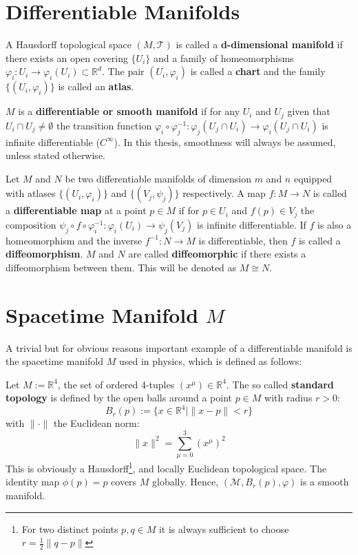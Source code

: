 \section{Differentiable Manifolds}

A Hausdorff topological space $(M,\mathcal{T})$ is called a \textbf{d-dimensional manifold} if there exists an open covering \( \{U_i\} \) and a family of homeomorphisms \( \varphi_i: U_i \to \varphi_i(U_i) \subset \mathbb{R}^d \). The pair \( (U_i, \varphi_i) \) is called a \textbf{chart} and the family $\{(U_i,\varphi_i)\}$ is called an \textbf{atlas}\cite{FredericSchullerTopologicalmanifoldsmanifoldbundlesLec06FredericSchuller2015}.

$M$ is a \textbf{differentiable or smooth manifold} if for any $U_i$ and $U_j$ given that $U_i\cap U_j \neq \emptyset$ the transition function $\varphi_i \circ \varphi_j^{-1}: \varphi_j(U_j \cap U_i) \to \varphi_i(U_j \cap U_i)$ is infinite differentiable ($C^\infty$)\cite{NakaharaGeometrytopologyphysics2005}. In this thesis, smoothness will always be assumed, unless stated otherwise.

Let $M$ and $N$ be two differentiable manifolds of dimension $m$ and $n$ equipped with atlases $\{(U_i, \varphi_i)\}$ and $\{(V_j, \psi_j)\}$ respectively. A map \( f: M \to N \) is called a \textbf{differentiable map} at a point $p \in M$ if for $p \in U_i$ and $f(p) \in V_j$ the composition \( \psi_j \circ f \circ \varphi_i^{-1} : \varphi_i(U_i) \to \psi_j(V_j) \) is infinite differentiable. If $f$ is also a homeomorphism and the inverse \( f^{-1} : N \to M \) is differentiable, then $f$ is called a \textbf{diffeomorphism}. $M$ and $N$ are called \textbf{diffeomorphic} if there exists a diffeomorphism between them. This will be denoted as \( M \cong N \).


\section{Spacetime Manifold $M$}\label{sec:spacetime-manifold}

A trivial but for obvious reasons important example of a differentiable manifold is the spacetime manifold $M$ used in physics, which is defined as follows:

Let $M := \mathbb{R}^4$, the set of ordered 4-tuples $(x^\mu) \in \mathbb{R}^4$. The so called \textbf{standard topology} is defined by the open balls around a point $p \in M$ with radius $r > 0$:
\[
B_r(p) := \{ x \in \mathbb{R}^4 \mid \|x - p\| < r \}
\]
with $\| \cdot \|$ the Euclidean norm:
\[
\|x\|^2 = \sum_{\mu=0}^3 (x^\mu)^2
\]
This is obviously a Hausdorff\footnote{For two distinct points $p,q \in M$ it is always sufficient to choose $r=\frac12\|q - p\|$}, and locally Euclidean topological space. The identity map $\phi(p)=p$ covers $M$ globally. Hence, $(\mathcal{M}, B_r(p), \varphi)$ is a smooth manifold.
